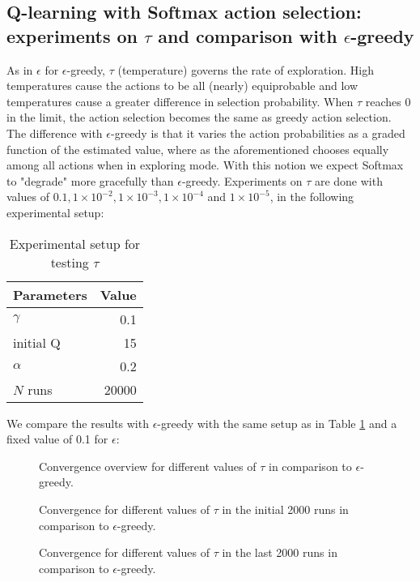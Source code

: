 \documentclass[paper=a4, fontsize=11pt]{scrartcl}
\numberwithin{equation}{section}		%
\numberwithin{figure}{section}			%
\numberwithin{table}{section}				%
\begin{document}
\subsection{Q-learning with Softmax action selection: experiments on $\tau$ and comparison with $\epsilon$-greedy}
As in $\epsilon$ for $\epsilon$-greedy, $\tau$ (temperature) governs the rate of exploration. High temperatures cause the actions to be all (nearly) equiprobable and low temperatures cause a greater difference in selection probability. When $\tau$ reaches 0 in the limit, the action selection becomes the same as greedy action selection. The difference with $\epsilon$-greedy is that it varies the action probabilities as a graded function of the estimated value, where as the aforementioned chooses equally among all actions when in exploring mode. With this notion we expect Softmax to "degrade" more gracefully than $\epsilon$-greedy. Experiments on $\tau$ are done with values of $0.1, 1 \times 10^{-2}, 1 \times 10^{-3}, 1 \times 10^{-4}$ and $1 \times 10^{-5}$, in the following experimental setup:
\begin{table}[H]
\caption{Experimental setup for testing $\tau$}
\centering
\begin{tabular}{|l|r|}
\hline
Parameters & Value \\\hline
$\gamma$ & 0.1 \\\hline
initial Q & 15 \\\hline
$\alpha$ & 0.2\\\hline
$N$ runs & 20000\\\hline
\end{tabular}
\label{expSetupSoftmax}
\end{table}
We compare the results with $\epsilon$-greedy with the same setup as in Table \ref{expSetupSoftmax} and a fixed value of 0.1 for $\epsilon$:
\begin{figure}[H] \centering
\caption{Convergence overview for different values of $\tau$ in comparison to $\epsilon$-greedy.} 
\label{figure:softmaxOverview}
\end{figure}
\begin{figure}[H] \centering
\caption{Convergence for different values of $\tau$ in the initial 2000 runs in comparison to $\epsilon$-greedy.} 
\label{figure:softmaxfirst20}
\end{figure}
\begin{figure}[H] \centering
\caption{Convergence for different values of $\tau$ in the last 2000 runs in comparison to $\epsilon$-greedy.} 
\label{figure:softmaxlast20}
\end{figure}
\end{document}
